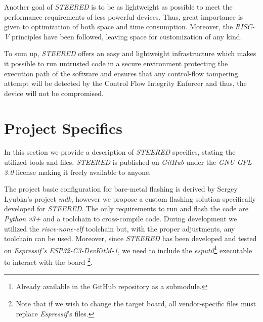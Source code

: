 Another goal of \textit{STEERED} is to be as lightweight as possible to meet the
performance requirements of less powerful devices. Thus, great importance is given
to optimization of both space and time consumption. Moreover, the \textit{RISC-V}
principles have been followed, leaving space for customization of any kind.

To sum up, \textit{STEERED} offers an easy and lightweight infrastructure which makes
it possible to run untrusted code in a secure environment protecting the execution
path of the software and ensures that any control-flow tampering attempt will be
detected by the Control Flow Integrity Enforcer and thus, the device will not be
compromised.

\section{Project Specifics}
\label{sec:project_specifics}

In this section we provide a description of \textit{STEERED} specifics, stating the
utilized tools and files. \textit{STEERED} is published on \textit{GitHub}\cite{repo}
under the \textit{GNU GPL-3.0} license\cite{gpl3} making it freely available to anyone.

The project basic configuration for bare-metal flashing is derived by Sergey Lyubka's
project \textit{mdk}\cite{mdk}, however we propose a custom flashing solution
specifically developed for \textit{STEERED}. The only requirements to run and
flash the code are \textit{Python v3+} and a toolchain to cross-compile code.
During development we utilized the \textit{riscv-none-elf}\cite{toolchain}
toolchain but, with the proper adjustments, any toolchain can be used. Moreover,
since \textit{STEERED} has been developed and tested on \textit{Espressif's
ESP32-C3-DevKitM-1}\cite{esp32c3}, we need to include the \textit{esputil}\footnote{Already
available in the GitHub repository as a submodule\cite{esputil}.} executable to
interact with the board \footnote{Note that if we wish to change the target
board, all vendor-specific files must replace \textit{Espressif}'s files.}.

